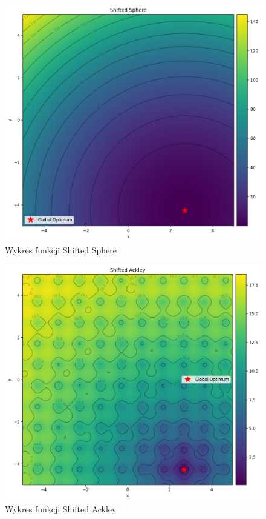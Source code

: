 \documentclass{article}
\begin{document}
\begin{figure}[H]
    \centering
    \includegraphics[width=\textwidth]{shifted_sphere.png}
    \caption{Wykres funkcji Shifted Sphere}
    \label{fig:plot1}
\end{figure}

\begin{figure}[H]
    \centering
    \includegraphics[width=\textwidth]{shifted_ackley.png}
    \caption{Wykres funkcji Shifted Ackley}
    \label{fig:plot2}
\end{figure}
\end{document}
